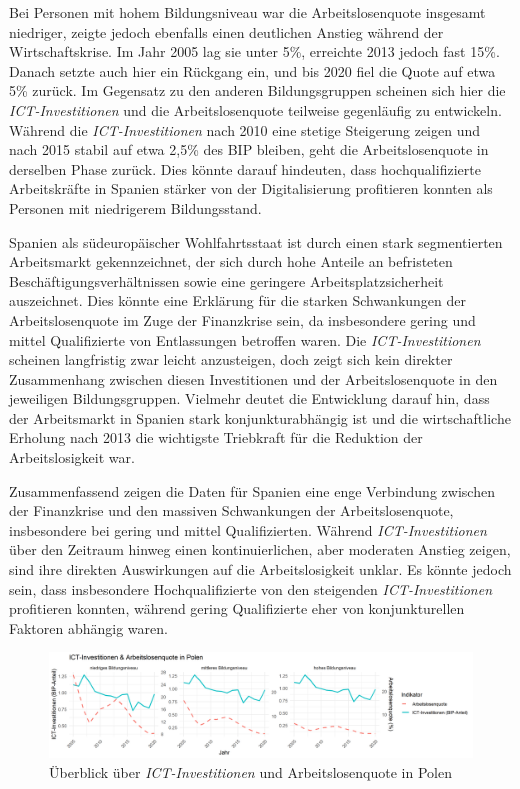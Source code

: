 Bei Personen mit hohem Bildungsniveau war die Arbeitslosenquote insgesamt niedriger, 
zeigte jedoch ebenfalls einen deutlichen Anstieg während der Wirtschaftskrise. Im Jahr 
2005 lag sie unter 5\%, erreichte 2013 jedoch fast 15\%. Danach setzte auch hier ein 
Rückgang ein, und bis 2020 fiel die Quote auf etwa 5\% zurück. Im Gegensatz zu den 
anderen Bildungsgruppen scheinen sich hier die \textit{\ac{ICT}-Investitionen} und 
die Arbeitslosenquote teilweise gegenläufig zu entwickeln. Während die 
\textit{\ac{ICT}-Investitionen} nach 2010 eine stetige Steigerung zeigen und nach 
2015 stabil auf etwa 2,5\% des BIP bleiben, geht die Arbeitslosenquote in derselben 
Phase zurück. Dies könnte darauf hindeuten, dass hochqualifizierte Arbeitskräfte in 
Spanien stärker von der Digitalisierung profitieren konnten als Personen mit 
niedrigerem Bildungsstand.

Spanien als südeuropäischer Wohlfahrtsstaat ist durch einen stark segmentierten 
Arbeitsmarkt gekennzeichnet, der sich durch hohe Anteile an befristeten 
Beschäftigungsverhältnissen sowie eine geringere Arbeitsplatzsicherheit auszeichnet. 
Dies könnte eine Erklärung für die starken Schwankungen der Arbeitslosenquote 
im Zuge der Finanzkrise sein, da insbesondere gering und mittel Qualifizierte 
von Entlassungen betroffen waren. Die \textit{\ac{ICT}-Investitionen} scheinen 
langfristig zwar leicht anzusteigen, doch zeigt sich kein direkter Zusammenhang 
zwischen diesen Investitionen und der Arbeitslosenquote in den jeweiligen 
Bildungsgruppen. Vielmehr deutet die Entwicklung darauf hin, dass der Arbeitsmarkt 
in Spanien stark konjunkturabhängig ist und die wirtschaftliche Erholung nach 2013 
die wichtigste Triebkraft für die Reduktion der Arbeitslosigkeit war.

Zusammenfassend zeigen die Daten für Spanien eine enge Verbindung zwischen der 
Finanzkrise und den massiven Schwankungen der Arbeitslosenquote, insbesondere bei 
gering und mittel Qualifizierten. Während \textit{\ac{ICT}-Investitionen} über den 
Zeitraum hinweg einen kontinuierlichen, aber moderaten Anstieg zeigen, sind ihre 
direkten Auswirkungen auf die Arbeitslosigkeit unklar. Es könnte jedoch sein, dass 
insbesondere Hochqualifizierte von den steigenden \textit{\ac{ICT}-Investitionen} 
profitieren konnten, während gering Qualifizierte eher von konjunkturellen 
Faktoren abhängig waren.

\begin{figure}[htbp]
    \centering
    \includegraphics[width=\textwidth]{assets/plot_poland.png}
    \caption{Überblick über \textit{\ac{ICT}-Investitionen} und Arbeitslosenquote 
    in Polen}
    \label{fig:poland}
\end{figure}

